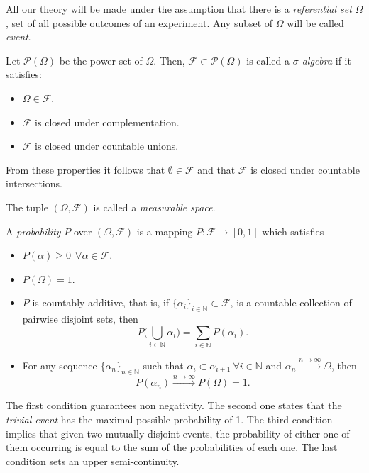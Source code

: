 
All our theory will be made under the assumption that there is a
\emph{referential set} \(\Omega\), set of all possible outcomes of an experiment. Any subset of
\(\Omega\) will be called \emph{event}.

\begin{definition}
Let \(\mathcal{P}(\Omega)\) be the power set of \(\Omega\). Then, \(\mathcal{F} \subset \mathcal{P}(\Omega)\) is called a
\emph{\(\sigma\)-algebra} if it satisfies:
\begin{itemize}
\item \(\Omega \in \mathcal{F}\).
\item \(\mathcal{F}\) is closed under complementation.
\item \(\mathcal{F}\) is closed under countable unions.
\end{itemize}
From these properties it follows that \(\emptyset \in \mathcal{F}\) and that \(\mathcal{F}\)
is closed under countable intersections.

The tuple \((\Omega, \mathcal{F})\) is called a \emph{measurable space}.
\end{definition}

\begin{definition}
A \emph{probability} \(P\) over \((\Omega, \mathcal{F})\) is a mapping
\(P: \mathcal{F} \to [0,1]\) which satisfies
\begin{itemize}
\item \(P(\alpha) \geq 0 \ \ \forall \alpha \in \mathcal{F}\).
\item \(P(\Omega) = 1\).
\item \(P\) is countably additive, that is, if \(\{\alpha_i\}_{i \in \mathbb{N}}
  \subset \mathcal{F}\), is a countable collection of pairwise disjoint sets,
  then
  \[
  P\big(\bigcup_{i\in \mathbb{N}}\alpha_i\big) = \sum_{i\in \mathbb{N}}P(\alpha_i).
  \]
\item For any sequence {\(\{\alpha_n\}_{n \in \mathbb{N}}\)} such that \(\alpha_i \subset
  \alpha_{i+1} \ \forall i \in \mathbb{N}\) and \(\alpha_n
  \xrightarrow{n \to \infty} \Omega\), then
  \[P(\alpha_n)
  \xrightarrow{n \to \infty} P(\Omega) = 1.\]
\end{itemize}
\end{definition}

The first condition guarantees non negativity. The second one states that the
\emph{trivial event} has the maximal possible probability of 1. The third condition implies that given two mutually disjoint events,
the probability of either one of them occurring is equal to the sum of the
probabilities of each one. The last condition sets an upper semi-continuity.

